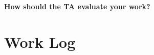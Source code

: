 \documentclass[10pt,onecolumn,draftclsnofoot]{IEEEtran} %
\begin{document}
\begin{singlespace}
        \textbf{How should the TA evaluate your work?}\\
	\section{\bf Work Log}

                

\newpage


\end{singlespace}
\restoregeometry
\end{document}

